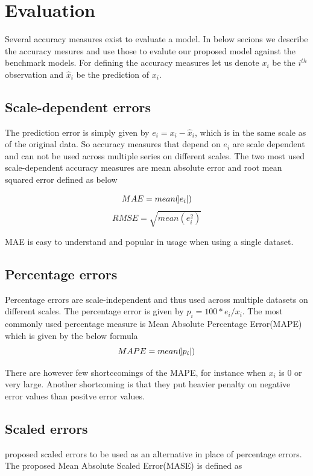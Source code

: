 \section{Evaluation}

Several accuracy measures exist to evaluate a model. In below secions we describe the accuracy
mesures and use those to evalute our proposed model against the benchmark models. For defining
the accuracy measures let us denote $x_{i}$ be the $i^{th}$ observation and $\hat{x}_{i}$ be the
prediction of $x_{i}$.

\subsection{Scale-dependent errors}
The prediction error is simply given by $e_{i} = x_{i} - \hat{x}_{i}$, which is in the same scale
as of the original data. So accuracy measures that depend on $e_{i}$ are scale dependent and can
not be used across multiple series on different scales. The two most used scale-dependent
accuracy measures are mean absolute error and root mean squared error defined as below

    \begin{equation}
        MAE = mean(\abs{e_{i}})
    \end{equation}
    \begin{equation}
        RMSE = \sqrt{mean(e^{2}_{i})}
    \end{equation}

MAE is easy to understand and popular in usage when using a single dataset.

\subsection{Percentage errors}
Percentage errors are scale-independent and thus used across multiple datasets on different
scales. The percentage error is given by $p_{i} = 100*e_{i}/x_{i}$. The most commonly used
percentage measure is Mean Absolute Percentage Error(MAPE) which is given by the below formula
    \begin{equation}
        MAPE = mean(\abs{p_{i}})
    \end{equation}

There are however few shortccomings of the MAPE, for instance when $x_{i}$ is 0 or very large.
Another shortcoming is that they put heavier penalty on negative error values than positve error
values.

\subsection{Scaled errors}
\citet{hyndman2006another} proposed scaled errors to be used as an alternative in place of
percentage errors. The proposed Mean Absolute Scaled Error(MASE) is defined as

